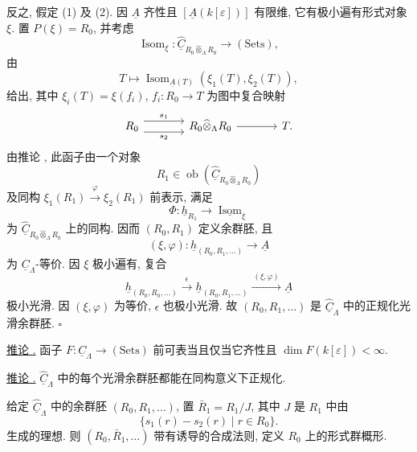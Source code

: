 反之, 假定 (1) 及 (2).
因 $\underline A$ 齐性且 $[\underline A(k[\varepsilon])]$ 有限维,
它有极小遍有形式对象 $\xi$. 置 $P(\xi)=R_0$, 并考虑
\[
 \operatorname{Isom}_\xi:
 \widehat{\underline C}_{R_0\widehat\otimes_\Lambda R_0}
 \longrightarrow(\mathrm{Sets}),
\]
由
\[
 T\longmapsto
 \operatorname{Isom}_{\underline A(T)}(\xi_1(T),\xi_2(T)),
\]
给出, 其中 $\xi_i(T)=\xi(f_i)$, $f_i:R_0\longrightarrow T$ 为图中复合映射
\[
\begin{tikzcd}[column sep=large]
 R_0 \arrow[r,shift left=2,"s_1"]
     \arrow[r,shift right=2,"s_2"']
 & R_0\widehat\otimes_\Lambda R_0 \arrow[r] & T.
\end{tikzcd}
\]
由推论 , 此函子由一个对象
\[
 R_1\in
 \operatorname{ob}(\widehat{\underline C}_{R_0\widehat\otimes_\Lambda R_0})
\]
及同构 $\xi_1(R_1)\xrightarrow{\varphi}\xi_2(R_1)$ 前表示, 满足
\[
 \Phi:\underline h_{R_1}\longrightarrow
 \underline{\operatorname{Isom}}_\xi
\]
为 $\widehat{\underline C}_{R_0\widehat\otimes_\Lambda R_0}$ 上的同构.
因而 $(R_0,R_1)$ 定义余群胚, 且
\[
 (\xi,\varphi):\underline h_{(R_0,R_1,\ldots)}
 \longrightarrow\underline A
\]
为 $\underline C_\Lambda$-等价.
因 $\xi$ 极小遍有, 复合
\[
 \underline h_{(R_0,R_0,\ldots)}
 \xrightarrow{\ \epsilon\ }
 \underline h_{(R_0,R_1,\ldots)}
 \xrightarrow{\ (\xi,\varphi)\ }
 \underline A
\]
极小光滑. 因 $(\xi,\varphi)$ 为等价, $\epsilon$ 也极小光滑.
故 $(R_0,R_1,\ldots)$ 是 $\widehat{\underline C}_\Lambda$ 中的正规化光滑余群胚.
\hfill$\square$



\underline{推论 .}
函子 $F:\underline C_\Lambda\longrightarrow(\mathrm{Sets})$
前可表当且仅当它齐性且 $\dim F(k[\varepsilon])<\infty$.

\underline{推论 .}
$\widehat{\underline C}_\Lambda$ 中的每个光滑余群胚都能在同构意义下正规化.

给定 $\widehat{\underline C}_\Lambda$ 中的余群胚 $(R_0,R_1,\ldots)$,
置 $\bar R_1=R_1/J$, 其中 $J$ 是 $R_1$ 中由
\[
 \{s_1(r)-s_2(r)\mid r\in R_0\}.
\]
生成的理想. 则 $(R_0,\bar R_1,\ldots)$ 带有诱导的合成法则,
定义 $R_0$ 上的形式群概形.

